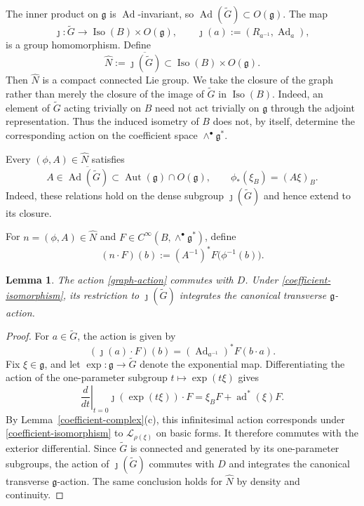 \documentclass[reqno, 11pt]{amsart}
\newtheorem{lem}[thm]{Lemma}
\theoremstyle{definition}
\theoremstyle{property}
\theoremstyle{remark}
\numberwithin{equation}{section}
\begin{document}
The inner product on $\mathfrak g$ is
$\operatorname{Ad}$-invariant, so
$\operatorname{Ad}(\widetilde G)\subset O(\mathfrak g)$. The map
\[
\jmath:\widetilde G
\longrightarrow
\operatorname{Iso}(B)\times O(\mathfrak g),
\qquad
\jmath(a):=(R_{a^{-1}},\operatorname{Ad}_a),
\]
is a group homomorphism. Define
\begin{equation}\label{graph-closure}
\widehat N
:=
\overline{\jmath(\widetilde G)}
\subset
\operatorname{Iso}(B)\times O(\mathfrak g).
\end{equation}
Then $\widehat N$ is a compact connected Lie group. We take the closure of the graph rather than merely the closure of the image
of $\widetilde G$ in $\operatorname{Iso}(B)$. Indeed, an element of $\widetilde G$ acting
trivially on $B$ need not act trivially on $\mathfrak g$ through the adjoint
representation. Thus the induced isometry of $B$ does not, by itself,
determine the corresponding action on the coefficient space
$\wedge^\bullet\mathfrak g^*$.




Every $(\phi,A)\in\widehat N$ satisfies
\begin{equation}\label{graph-relations}
A\in\overline{\operatorname{Ad}(\widetilde G)}
\subset\operatorname{Aut}(\mathfrak g)\cap O(\mathfrak g),
\qquad
\phi_*(\xi_B)=(A\xi)_B.
\end{equation}
Indeed, these relations hold on the dense subgroup
$\jmath(\widetilde G)$ and hence extend to its closure.

For $n=(\phi,A)\in\widehat N$ and
$F\in C^\infty(B,\wedge^\bullet\mathfrak g^*)$, define
\begin{equation}\label{graph-action}
(n\cdot F)(b)
:=
(A^{-1})^*F\bigl(\phi^{-1}(b)\bigr).
\end{equation}

\begin{lem}\label{graph-action-lemma}
The action \eqref{graph-action} commutes with $D$. Under
\eqref{coefficient-isomorphism}, its restriction to
$\jmath(\widetilde G)$ integrates the canonical transverse
$\mathfrak g$-action.
\end{lem}

\begin{proof}
For $a\in\widetilde G$, the action is given by
\[
(\jmath(a)\cdot F)(b)
=
(\operatorname{Ad}_{a^{-1}})^*F(b\cdot a).
\]
Fix $\xi\in\mathfrak g$, and let
$\exp:\mathfrak g\to\widetilde G$ denote the exponential map. Differentiating
the action of the one-parameter subgroup $t\mapsto\exp(t\xi)$ gives
\[
\left.\frac{d}{dt}\right|_{t=0}
\jmath(\exp(t\xi))\cdot F
=
\xi_BF+\operatorname{ad}^*(\xi)F.
\]
By Lemma~\ref{coefficient-complex}(c), this infinitesimal action corresponds
under \eqref{coefficient-isomorphism} to
$\mathcal L_{\rho(\xi)}$ on basic forms. It therefore commutes with the
exterior differential. Since $\widetilde G$ is connected and generated by
its one-parameter subgroups, the action of $\jmath(\widetilde G)$ commutes
with $D$ and integrates the canonical transverse $\mathfrak g$-action. The
same conclusion holds for $\widehat N$ by density and continuity.
\end{proof}
\end{document}
